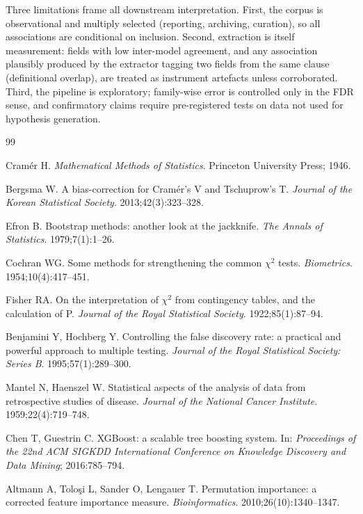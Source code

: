 \documentclass[11pt,a4paper]{article}
\begin{document}
Three limitations frame all downstream interpretation. First, the corpus is
observational and multiply selected (reporting, archiving, curation), so all
associations are conditional on inclusion. Second, extraction is itself measurement:
fields with low inter-model agreement, and any association plausibly produced by the
extractor tagging two fields from the same clause (definitional overlap), are treated
as instrument artefacts unless corroborated. Third, the pipeline is exploratory;
family-wise error is controlled only in the FDR sense, and confirmatory claims require
pre-registered tests on data not used for hypothesis generation.

\begin{thebibliography}{99}\small

 Cram\'er H. \emph{Mathematical Methods of Statistics}.
Princeton University Press; 1946.

 Bergsma W. A bias-correction for Cram\'er's V and Tschuprow's T.
\emph{Journal of the Korean Statistical Society}. 2013;42(3):323--328.

 Efron B. Bootstrap methods: another look at the jackknife.
\emph{The Annals of Statistics}. 1979;7(1):1--26.

 Cochran WG. Some methods for strengthening the common
$\chi^2$ tests. \emph{Biometrics}. 1954;10(4):417--451.

 Fisher RA. On the interpretation of $\chi^2$ from contingency
tables, and the calculation of P. \emph{Journal of the Royal Statistical Society}.
1922;85(1):87--94.

 Benjamini Y, Hochberg Y. Controlling the false discovery rate:
a practical and powerful approach to multiple testing.
\emph{Journal of the Royal Statistical Society: Series B}. 1995;57(1):289--300.

 Mantel N, Haenszel W. Statistical aspects of the analysis of data
from retrospective studies of disease.
\emph{Journal of the National Cancer Institute}. 1959;22(4):719--748.

 Chen T, Guestrin C. XGBoost: a scalable tree boosting system. In:
\emph{Proceedings of the 22nd ACM SIGKDD International Conference on Knowledge
Discovery and Data Mining}; 2016:785--794.

 Altmann A, Tolo\c{s}i L, Sander O, Lengauer T. Permutation
importance: a corrected feature importance measure.
\emph{Bioinformatics}. 2010;26(10):1340--1347.


\end{thebibliography}
\end{document}
